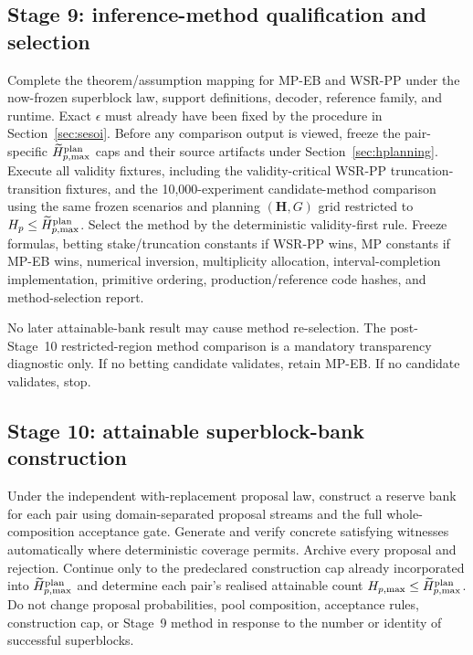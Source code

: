 \documentclass[11pt,a4paper]{article}
\begin{document}
\subsection{Stage 9: inference-method qualification and selection}
Complete the theorem/assumption mapping for MP-EB and WSR-PP under the now-frozen superblock law, support definitions, decoder, reference family, and runtime. Exact $\epsilon$ must already have been fixed by the procedure in Section~\ref{sec:sesoi}. Before any comparison output is viewed, freeze the pair-specific $\widetilde H_{p,\max}^{\rm plan}$ caps and their source artifacts under Section~\ref{sec:hplanning}. Execute all validity fixtures, including the validity-critical WSR-PP truncation-transition fixtures, and the 10,000-experiment candidate-method comparison using the same frozen scenarios and planning $(\mathbf H,G)$ grid restricted to $H_p\le\widetilde H_{p,\max}^{\rm plan}$. Select the method by the deterministic validity-first rule. Freeze formulas, betting stake/truncation constants if WSR-PP wins, MP constants if MP-EB wins, numerical inversion, multiplicity allocation, interval-completion implementation, primitive ordering, production/reference code hashes, and method-selection report.

No later attainable-bank result may cause method re-selection. The post-Stage~10 restricted-region method comparison is a mandatory transparency diagnostic only. If no betting candidate validates, retain MP-EB. If no candidate validates, stop.

\subsection{Stage 10: attainable superblock-bank construction}
Under the independent with-replacement proposal law, construct a reserve bank for each pair using domain-separated proposal streams and the full whole-composition acceptance gate. Generate and verify concrete satisfying witnesses automatically where deterministic coverage permits. Archive every proposal and rejection. Continue only to the predeclared construction cap already incorporated into $\widetilde H_{p,\max}^{\rm plan}$ and determine each pair's realised attainable count $H_{p,\max}\le\widetilde H_{p,\max}^{\rm plan}$. Do not change proposal probabilities, pool composition, acceptance rules, construction cap, or Stage~9 method in response to the number or identity of successful superblocks.
\end{document}
